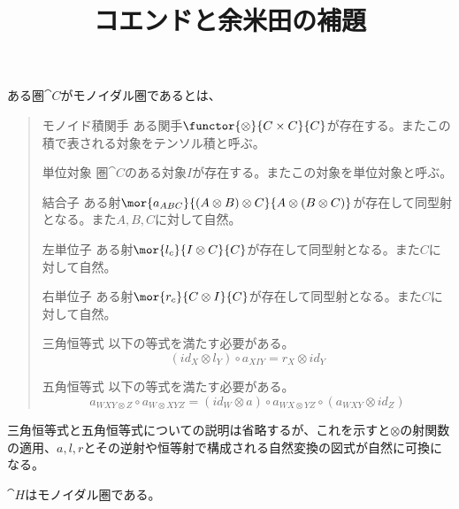 \documentclass[uplatex,dvipdfmx]{jsarticle}
\begin{document}
\title{コエンドと余米田の補題}
\maketitle
  \begin{define}[モノイダル圏]
    ある圏$\cat{C}$がモノイダル圏であるとは、
    \begin{quote}
      \begin{mydescription}
        \item[モノイド積関手]
        ある関手$\functor{\otimes}{C\times C}{C}$が存在する。またこの積で表される対象をテンソル積と呼ぶ。
        \item[単位対象]圏$\cat{C}$のある対象$I$が存在する。またこの対象を単位対象と呼ぶ。
        \item[結合子]ある射$\mor{a_{ABC}}{(A\otimes B)\otimes C}{A\otimes(B\otimes C)}$が存在して同型射となる。また$A,B,C$に対して自然。
        \item[左単位子]ある射$\mor{l_c}{I\otimes C}{C}$が存在して同型射となる。また$C$に対して自然。
        \item[右単位子]ある射$\mor{r_c}{C\otimes I}{C}$が存在して同型射となる。また$C$に対して自然。
        \item[三角恒等式]以下の等式を満たす必要がある。
        \[(id_X\otimes l_Y)\circ a_{XIY}=r_X\otimes id_Y\]
        \item[五角恒等式]以下の等式を満たす必要がある。
        \[a_{WXY\otimes Z}\circ a_{W\otimes XYZ}=(id_W\otimes a)\circ a_{WX\otimes YZ}\circ(a_{WXY}\otimes id_Z) \]
      \end{mydescription}
    \end{quote}
  \end{define}
  三角恒等式と五角恒等式についての説明は省略するが、これを示すと$\otimes$の射関数の適用、$a,l,r$とその逆射や恒等射で構成される自然変換の図式が自然に可換になる。
  \begin{prop}
    $\cat{H}$はモノイダル圏である。
  \end{prop}
\end{document}
